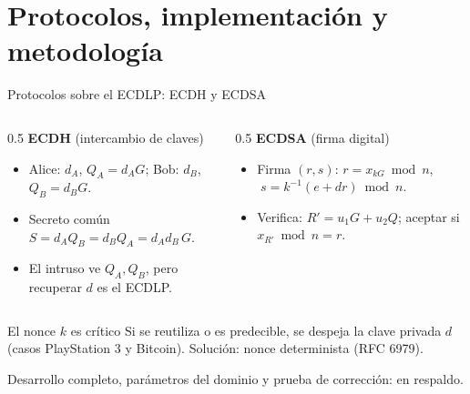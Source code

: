 \documentclass[aspectratio=169,11pt]{beamer}
\begin{document}
\section{Protocolos, implementación y metodología}

\begin{frame}{Protocolos sobre el ECDLP: ECDH y ECDSA}
  \small
  \begin{columns}[t]
    \begin{column}{0.5\textwidth}
      \textbf{ECDH} (intercambio de claves)
      \begin{itemize}\footnotesize
        \item Alice: $d_A$, $Q_A=d_AG$; \; Bob: $d_B$, $Q_B=d_BG$.
        \item Secreto común $S = d_A Q_B = d_B Q_A = d_A d_B\,G$.
        \item El intruso ve $Q_A,Q_B$, pero recuperar $d$ es el ECDLP.
      \end{itemize}
    \end{column}
    \begin{column}{0.5\textwidth}
      \textbf{ECDSA} (firma digital)
      \begin{itemize}\footnotesize
        \item Firma $(r,s)$: $r=x_{kG}\bmod n$, $\;s=k^{-1}(e+dr)\bmod n$.
        \item Verifica: $R'=u_1 G + u_2 Q$; aceptar si $x_{R'}\bmod n = r$.
      \end{itemize}
    \end{column}
  \end{columns}
  \vfill
  \begin{alertblock}{El nonce $k$ es crítico}
    \footnotesize Si se reutiliza o es predecible, se despeja la clave privada $d$
    (casos PlayStation 3 y Bitcoin). Solución: nonce determinista (RFC 6979).
  \end{alertblock}
  \footnotesize Desarrollo completo, parámetros del dominio y prueba de corrección: en respaldo.
\end{frame}
\end{document}
